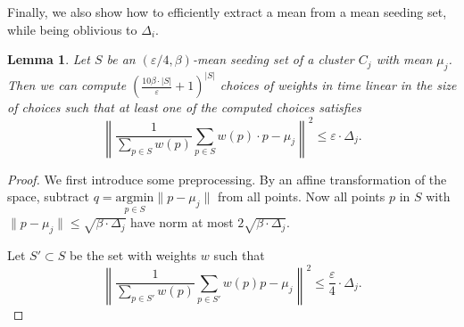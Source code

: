 \documentclass[10pt,a4paper]{amsart}
\newtheorem{lemma}[theorem]{Lemma}
\begin{document}
Finally, we also show how to efficiently extract a mean from a mean seeding set, while being oblivious to $\Delta_i$.
\begin{lemma}
\label{lem:constructive}
    Let $S$ be an $(\varepsilon/4,\beta)$-mean seeding set of a cluster $C_j$ with mean $\mu_j$. Then we can compute    $\left(\frac{10\beta\cdot |S|}{\varepsilon}+1\right)^{|S|}$ choices of weights in time linear in the size of choices such that at least one of the computed choices satisfies
    $$\left\|\frac{1}{\sum_{p\in S} w(p)}\sum_{p\in S} w(p) \cdot p - \mu_j\right\|^2\leq \varepsilon\cdot \Delta_j.$$
\end{lemma}
\begin{proof}
We first introduce some preprocessing. By an affine transformation of the space, subtract $q = \underset{p\in S}{\text{argmin}}\|p-\mu_j\|$ from all points. Now all points $p$ in $S$ with $\|p-\mu_j\|\leq \sqrt{\beta\cdot \Delta_j}$ have norm at most $2\sqrt{\beta\cdot \Delta_j}$. 

Let $S'\subset S$ be the set with weights $w$ such that
$$\left\|\frac{1}{\sum_{p\in S'}w(p)}\sum_{p\in S'}w(p)p - \mu_j\right\|^2\leq \frac{\varepsilon}{4}\cdot \Delta_j.$$


\end{proof}
\end{document}
